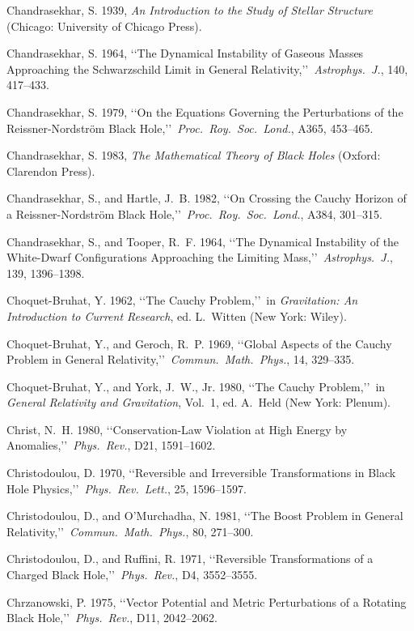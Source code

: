 \item Chandrasekhar, S. 1939, \emph{An Introduction to the Study of Stellar Structure} (Chicago: University of Chicago Press).
\item Chandrasekhar, S. 1964, \lq\lq The Dynamical Instability of Gaseous Masses Approaching the Schwarzschild Limit in General Relativity,\rq\rq\ \emph{Astrophys.\ J.}, 140, 417--433.
\item Chandrasekhar, S. 1979, \lq\lq On the Equations Governing the Perturbations of the Reissner-Nordstr{\"o}m Black Hole,\rq\rq\ \emph{Proc.\ Roy.\ Soc.\ Lond.}, A365, 453--465.
\item Chandrasekhar, S. 1983, \emph{The Mathematical Theory of Black Holes} (Oxford: Clarendon Press).
\item Chandrasekhar, S., and Hartle, J.~B. 1982, \lq\lq On Crossing the Cauchy Horizon of a Reissner-Nordstr{\"o}m Black Hole,\rq\rq\ \emph{Proc.\ Roy.\ Soc.\ Lond.}, A384, 301--315.
\item Chandrasekhar, S., and Tooper, R.~F. 1964, \lq\lq The Dynamical Instability of the White-Dwarf Configurations Approaching the Limiting Mass,\rq\rq\ \emph{Astrophys.\ J.}, 139, 1396--1398.
\item Choquet-Bruhat, Y. 1962, \lq\lq The Cauchy Problem,\rq\rq\ in \emph{Gravitation: An Introduction to Current Research}, ed. L.~Witten (New York: Wiley).
\item Choquet-Bruhat, Y., and Geroch, R.~P. 1969, \lq\lq Global Aspects of the Cauchy Problem in General Relativity,\rq\rq\ \emph{Commun.\ Math.\ Phys.}, 14, 329--335.
\item Choquet-Bruhat, Y., and York, J.~W., Jr. 1980, \lq\lq The Cauchy Problem,\rq\rq\ in \emph{General Relativity and Gravitation}, Vol.~1, ed. A.~Held (New York: Plenum).
\item Christ, N.~H. 1980, \lq\lq Conservation-Law Violation at High Energy by Anomalies,\rq\rq\ \emph{Phys.\ Rev.}, D21, 1591--1602.
\item Christodoulou, D. 1970, \lq\lq Reversible and Irreversible Transformations in Black Hole Physics,\rq\rq\ \emph{Phys.\ Rev.\ Lett.}, 25, 1596--1597.
\item Christodoulou, D., and O'Murchadha, N. 1981, \lq\lq The Boost Problem in General Relativity,\rq\rq\ \emph{Commun.\ Math.\ Phys.}, 80, 271--300.
\item Christodoulou, D., and Ruffini, R. 1971, \lq\lq Reversible Transformations of a Charged Black Hole,\rq\rq\ \emph{Phys.\ Rev.}, D4, 3552--3555.
\item Chrzanowski, P. 1975, \lq\lq Vector Potential and Metric Perturbations of a Rotating Black Hole,\rq\rq\ \emph{Phys.\ Rev.}, D11, 2042--2062.
